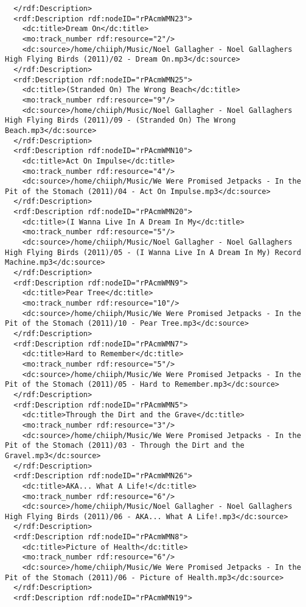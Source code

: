\documentclass[a4paper,oneside]{report}
\begin{document}
\begin{lstlisting}
  </rdf:Description>
  <rdf:Description rdf:nodeID="rPAcmWMN23">
    <dc:title>Dream On</dc:title>
    <mo:track_number rdf:resource="2"/>
    <dc:source>/home/chiiph/Music/Noel Gallagher - Noel Gallaghers High Flying Birds (2011)/02 - Dream On.mp3</dc:source>
  </rdf:Description>
  <rdf:Description rdf:nodeID="rPAcmWMN25">
    <dc:title>(Stranded On) The Wrong Beach</dc:title>
    <mo:track_number rdf:resource="9"/>
    <dc:source>/home/chiiph/Music/Noel Gallagher - Noel Gallaghers High Flying Birds (2011)/09 - (Stranded On) The Wrong Beach.mp3</dc:source>
  </rdf:Description>
  <rdf:Description rdf:nodeID="rPAcmWMN10">
    <dc:title>Act On Impulse</dc:title>
    <mo:track_number rdf:resource="4"/>
    <dc:source>/home/chiiph/Music/We Were Promised Jetpacks - In the Pit of the Stomach (2011)/04 - Act On Impulse.mp3</dc:source>
  </rdf:Description>
  <rdf:Description rdf:nodeID="rPAcmWMN20">
    <dc:title>(I Wanna Live In A Dream In My</dc:title>
    <mo:track_number rdf:resource="5"/>
    <dc:source>/home/chiiph/Music/Noel Gallagher - Noel Gallaghers High Flying Birds (2011)/05 - (I Wanna Live In A Dream In My) Record Machine.mp3</dc:source>
  </rdf:Description>
  <rdf:Description rdf:nodeID="rPAcmWMN9">
    <dc:title>Pear Tree</dc:title>
    <mo:track_number rdf:resource="10"/>
    <dc:source>/home/chiiph/Music/We Were Promised Jetpacks - In the Pit of the Stomach (2011)/10 - Pear Tree.mp3</dc:source>
  </rdf:Description>
  <rdf:Description rdf:nodeID="rPAcmWMN7">
    <dc:title>Hard to Remember</dc:title>
    <mo:track_number rdf:resource="5"/>
    <dc:source>/home/chiiph/Music/We Were Promised Jetpacks - In the Pit of the Stomach (2011)/05 - Hard to Remember.mp3</dc:source>
  </rdf:Description>
  <rdf:Description rdf:nodeID="rPAcmWMN5">
    <dc:title>Through the Dirt and the Grave</dc:title>
    <mo:track_number rdf:resource="3"/>
    <dc:source>/home/chiiph/Music/We Were Promised Jetpacks - In the Pit of the Stomach (2011)/03 - Through the Dirt and the Gravel.mp3</dc:source>
  </rdf:Description>
  <rdf:Description rdf:nodeID="rPAcmWMN26">
    <dc:title>AKA... What A Life!</dc:title>
    <mo:track_number rdf:resource="6"/>
    <dc:source>/home/chiiph/Music/Noel Gallagher - Noel Gallaghers High Flying Birds (2011)/06 - AKA... What A Life!.mp3</dc:source>
  </rdf:Description>
  <rdf:Description rdf:nodeID="rPAcmWMN8">
    <dc:title>Picture of Health</dc:title>
    <mo:track_number rdf:resource="6"/>
    <dc:source>/home/chiiph/Music/We Were Promised Jetpacks - In the Pit of the Stomach (2011)/06 - Picture of Health.mp3</dc:source>
  </rdf:Description>
  <rdf:Description rdf:nodeID="rPAcmWMN19">

\end{lstlisting}
\end{document}
